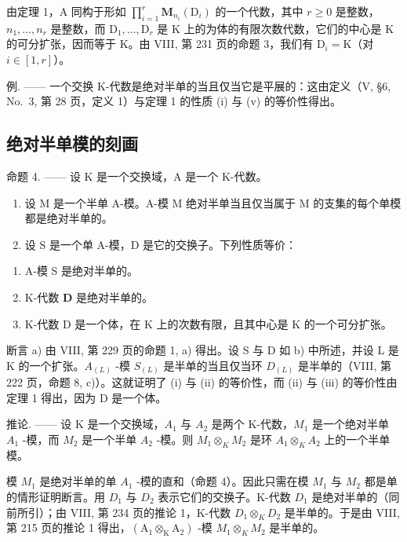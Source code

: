 由定理 1，A 同构于形如 \(\prod_{i=1}^{r} \mathbf{M}_{n_i}(\mathrm{D}_i)\) 的一个代数，其中 \(r \geqslant 0\) 是整数，\(n_1, \ldots, n_r\) 是整数，而 \(\mathrm{D}_1, \ldots, \mathrm{D}_r\) 是 K 上的为体的有限次数代数，它们的中心是 K 的可分扩张，因而等于 K。由 VIII, 第 231 页的命题 3，我们有 \(\mathrm{D}_i = \mathrm{K}\)（对 \(i \in [1, r]\)）。

例. —— 一个交换 K-代数是绝对半单的当且仅当它是平展的：这由定义（V, §6, No.~3, 第 28 页，定义 1）与定理 1 的性质 (i) 与 (v) 的等价性得出。

\subsection{绝对半单模的刻画}

命题 4. —— 设 K 是一个交换域，A 是一个 K-代数。

\begin{enumerate}
\def\labelenumi{\alph{enumi})}
\item
  设 M 是一个半单 A-模。A-模 M 绝对半单当且仅当属于 M 的支集的每个单模都是绝对半单的。
\item
  设 S 是一个单 A-模，D 是它的交换子。下列性质等价：
\end{enumerate}

\begin{enumerate}
\def\labelenumi{(\roman{enumi})}
\item
  A-模 S 是绝对半单的。
\item
  K-代数 \(\mathbf{D}\) 是绝对半单的。
\item
  K-代数 D 是一个体，在 K 上的次数有限，且其中心是 K 的一个可分扩张。
\end{enumerate}

断言 a) 由 VIII, 第 229 页的命题 1, a) 得出。设 S 与 D 如 b) 中所述，并设 L 是 K 的一个扩张。\(A_{(L)}\) -模 \(S_{(L)}\) 是半单的当且仅当环 \(D_{(L)}\) 是半单的（VIII, 第 222 页，命题 8, c)）。这就证明了 (i) 与 (ii) 的等价性，而 (ii) 与 (iii) 的等价性由定理 1 得出，因为 D 是一个体。

推论. —— 设 K 是一个交换域，\(A_{1}\) 与 \(A_{2}\) 是两个 K-代数，\(M_{1}\) 是一个绝对半单 \(A_{1}\) -模，而 \(M_{2}\) 是一个半单 \(A_{2}\) -模。则 \(M_{1} \otimes_{K} M_{2}\) 是环 \(A_{1} \otimes_{K} A_{2}\) 上的一个半单模。

模 \(M_{1}\) 是绝对半单的单 \(A_{1}\) -模的直和（命题 4）。因此只需在模 \(M_{1}\) 与 \(M_{2}\) 都是单的情形证明断言。用 \(D_{1}\) 与 \(D_{2}\) 表示它们的交换子。K-代数 \(D_{1}\) 是绝对半单的（同前所引）；由 VIII, 第 234 页的推论 1，K-代数 \(D_{1} \otimes_{K} D_{2}\) 是半单的。于是由 VIII, 第 215 页的推论 1 得出，\((\mathrm{A}_{1} \otimes_{\mathrm{K}} \mathrm{A}_{2})\) -模 \(M_{1} \otimes_{K} M_{2}\) 是半单的。

